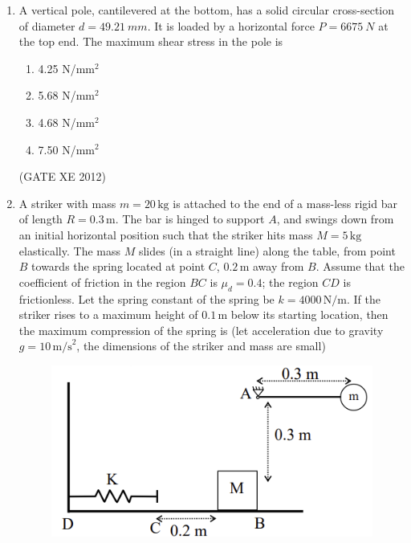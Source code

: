 \documentclass[12pt]{article}
\begin{document}
\begin{enumerate}
\begin{multicols}{2}
\begin{enumerate}
    \item 0
    \item $\dfrac{Ql}{AE}$
    \item $\dfrac{\sqrt{3}Ql}{(4AE)}$
    \item $\dfrac{Ql}{(\sqrt{3}AE)}$
\end{enumerate}
\end{multicols}
(GATE XE 2012)


\item A vertical pole, cantilevered at the bottom, has a solid circular cross-section of diameter $d=49.21~mm$. 
It is loaded by a horizontal force $P=6675~N$ at the top end. The maximum shear stress in the pole is  

\begin{multicols}{4}
\begin{enumerate}
    \item 4.25 N/mm$^2$
    \item 5.68 N/mm$^2$
    \item 4.68 N/mm$^2$
    \item 7.50 N/mm$^2$
\end{enumerate}
\end{multicols}
(GATE XE 2012)

\item A striker with mass $m=20 \,\text{kg}$ is attached to the end of a mass-less rigid bar of length $R=0.3 \,\text{m}$. The bar is hinged to support $A$, and swings down from an initial horizontal position such that the striker hits mass $M=5 \,\text{kg}$ elastically. The mass $M$ slides (in a straight line) along the table, from point $B$ towards the spring located at point $C$, $0.2 \,\text{m}$ away from $B$. Assume that the coefficient of friction in the region $BC$ is $\mu_d = 0.4$; the region $CD$ is frictionless. Let the spring constant of the spring be $k=4000 \,\text{N/m}$. If the striker rises to a maximum height of $0.1 \,\text{m}$ below its starting location, then the maximum compression of the spring is (let acceleration due to gravity $g=10 \,\text{m/s}^2$, the dimensions of the striker and mass are small)

\begin{figure}[H]
    \centering
    \includegraphics[width=0.5\columnwidth]{figs/ass2_d_q13.png}
    \caption{}
    \label{fig:placeholder}
\end{figure}


\end{enumerate}
\end{document}
